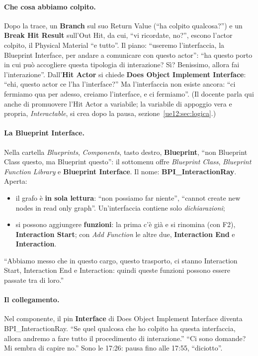 \paragraph{Che cosa abbiamo colpito.} Dopo la trace, un \textbf{Branch} sul suo Return
Value (``ha colpito qualcosa?'') e un \textbf{Break Hit Result} sull'Out Hit, da cui, ``vi
ricordate, no?'', escono l'actor colpito, il Physical Material ``e tutto''. Il piano:
``useremo l'interfaccia, la Blueprint Interface, per andare a comunicare con questo actor'':
``ha questo porto in cui può accogliere questa tipologia di interazione? Sì? Benissimo,
allora fai l'interazione''. Dall'\textbf{Hit Actor} si chiede \textbf{Does Object
Implement Interface}: ``ehi, questo actor ce l'ha l'interface?'' Ma l'interfaccia non
esiste ancora: ``ci fermiamo qua per adesso, creiamo l'interface, e ci fermiamo''. (Il
docente parla qui anche di promuovere l'Hit Actor a variabile; la variabile di appoggio
vera e propria, \emph{Interactable}, si crea dopo la pausa, sezione~\ref{ue12:sec:logica}.)

\paragraph{La Blueprint Interface.} Nella cartella \emph{Blueprints}, \emph{Components},
tasto destro, \textbf{Blueprint}, ``non Blueprint Class questo, ma Blueprint questo'': il
sottomenu offre \emph{Blueprint Class}, \emph{Blueprint Function Library} e
\textbf{Blueprint Interface}. Il nome: \textbf{BPI\_InteractionRay}. Aperta:
\begin{itemize}
  \item il grafo è \textbf{in sola lettura}: ``non possiamo far niente'', ``cannot create
        new nodes in read only graph''. Un'interfaccia contiene solo \emph{dichiarazioni};
  \item si possono aggiungere \textbf{funzioni}: la prima c'è già e si rinomina (con F2),
        \textbf{Interaction Start}; con \emph{Add Function} le altre due,
        \textbf{Interaction End} e \textbf{Interaction}.
\end{itemize}
``Abbiamo messo che in questo cargo, questo trasporto, ci stanno Interaction Start,
Interaction End e Interaction: quindi queste funzioni possono essere passate tra di loro.''

\paragraph{Il collegamento.} Nel componente, il pin \textbf{Interface} di Does Object
Implement Interface diventa \mbox{BPI\_}\allowbreak InteractionRay. ``Se quel qualcosa che ho colpito ha questa
interfaccia, allora andremo a fare tutto il procedimento di interazione.'' ``Ci sono domande?
Mi sembra di capire no.'' Sono le 17:26: pausa fino alle 17:55, ``diciotto''.

